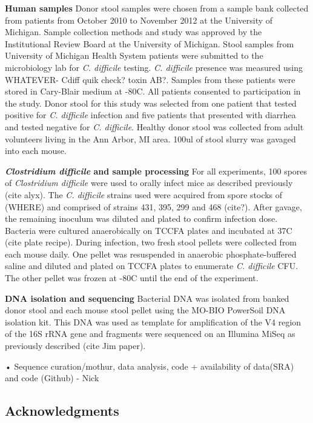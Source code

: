 \documentclass[11pt,]{article}
\begin{document}
\textbf{Human samples} Donor stool samples were chosen from a sample
bank collected from patients from October 2010 to November 2012 at the
University of Michigan. Sample collection methods and study was approved
by the Institutional Review Board at the University of Michigan. Stool
samples from University of Michigan Health System patients were
submitted to the microbiology lab for \emph{C. difficile} testing.
\emph{C. difficile} presence was measured using WHATEVER- Cdiff quik
check? toxin AB?. Samples from these patients were stored in Cary-Blair
medium at -80C. All patients consented to participation in the study.
Donor stool for this study was selected from one patient that tested
positive for \emph{C. difficile} infection and five patients that
presented with diarrhea and tested negative for \emph{C. difficile}.
Healthy donor stool was collected from adult volunteers living in the
Ann Arbor, MI area. 100ul of stool slurry was gavaged into each mouse.

\textbf{\emph{Clostridium difficile} and sample processing} For all
experiments, 100 spores of \emph{Clostridium difficile} were used to
orally infect mice as described previously (cite alyx). The \emph{C.
difficile} strains used were acquired from spore stocks of (WHERE) and
comprised of strains 431, 395, 299 and 468 (cite?). After gavage, the
remaining inoculum was diluted and plated to confirm infection dose.
Bacteria were cultured anaerobically on TCCFA plates and incubated at
37C (cite plate recipe). During infection, two fresh stool pellets were
collected from each mouse daily. One pellet was resuspended in anaerobic
phosphate-buffered saline and diluted and plated on TCCFA plates to
enumerate \emph{C. difficile} CFU. The other pellet was frozen at -80C
until the end of the experiment.

\textbf{DNA isolation and sequencing} Bacterial DNA was isolated from
banked donor stool and each mouse stool pellet using the MO-BIO
PowerSoil DNA isolation kit. This DNA was used as template for
amplification of the V4 region of the 16S rRNA gene and fragments were
sequenced on an Illumina MiSeq as previously described (cite Jim paper).

• Sequence curation/mothur, data analysis, code + availability of
data(SRA) and code (Github) - Nick

\subsection{Acknowledgments}\label{acknowledgments}
\end{document}
